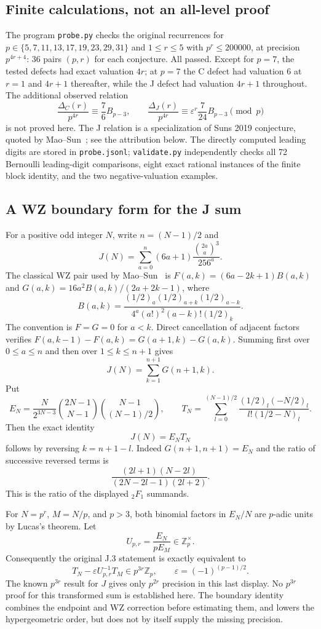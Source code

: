 \documentclass[11pt,letterpaper]{article}
\numberwithin{equation}{section}
\begin{document}
\subsection{Finite calculations, not an all-level proof}
The program \texttt{probe.py} checks the original recurrences for
$p\in\{5,7,11,13,17,19,23,29,31\}$ and $1\le r\le5$ with
$p^r\le200000$, at precision $p^{4r+4}$: 36 pairs $(p,r)$ for each
conjecture. All passed. Except for $p=7$, the tested defects had exact
valuation $4r$; at $p=7$ the C defect had valuation $6$ at $r=1$ and
$4r+1$ thereafter, while the J defect had valuation $4r+1$ throughout.
The additional observed relation
\[
 \frac{\Delta_C(r)}{p^{4r}}\equiv\frac76 B_{p-3},\qquad
 \frac{\Delta_J(r)}{p^{4r}}\equiv\varepsilon^r\frac7{24}B_{p-3}
 \pmod p
\]
is not proved here. The J relation is a specialization of Sun\textquotesingle s 2019 conjecture, quoted by Mao--Sun~\cite{II-MaoSun}; see the attribution below. The directly computed leading digits are stored
in \texttt{probe.jsonl}; \texttt{validate.py} independently checks all 72 Bernoulli leading-digit comparisons, eight exact rational instances of the finite block identity, and the two negative-valuation examples.

\subsection{A WZ boundary form for the J sum}
For a positive odd integer $N$, write $n=(N-1)/2$ and
\[
 J(N)=\sum_{a=0}^{n}(6a+1)\frac{\binom{2a}{a}^3}{256^a}.
\]
The classical WZ pair used by Mao--Sun~\cite[Section 3]{II-MaoSun} is
$F(a,k)=(6a-2k+1)B(a,k)$ and
$G(a,k)=16a^2B(a,k)/(2a+2k-1)$, where
\[
 B(a,k)=\frac{(1/2)_a(1/2)_{a+k}(1/2)_{a-k}}
 {4^a(a!)^2(a-k)!(1/2)_k}.
\]
The convention is $F=G=0$ for $a<k$. Direct cancellation of adjacent
factors verifies
$F(a,k-1)-F(a,k)=G(a+1,k)-G(a,k)$.
Summing first over $0\le a\le n$ and then over $1\le k\le n+1$ gives
\[
 J(N)=\sum_{k=1}^{n+1}G(n+1,k).
\]
Put
\[
 E_N=\frac{N}{2^{3N-3}}\binom{2N-1}{N-1}\binom{N-1}{(N-1)/2},
 \qquad
 T_N=\sum_{l=0}^{(N-1)/2}
 \frac{(1/2)_l(-N/2)_l}{l!(1/2-N)_l}.
\]
Then the exact identity
\[
 \boxed{J(N)=E_NT_N}
\]
follows by reversing $k=n+1-l$. Indeed $G(n+1,n+1)=E_N$ and the ratio
of successive reversed terms is
\[
 \frac{(2l+1)(N-2l)}{(2N-2l-1)(2l+2)}.
\]
This is the ratio of the displayed ${}_2F_1$ summands.

For $N=p^r$, $M=N/p$, and $p>3$, both binomial factors in $E_N/N$
are $p$-adic units by Lucas's theorem. Let
\[
 U_{p,r}=\frac{E_N}{pE_M}\in\mathbb Z_p^\times.
\]
Consequently the original J.3 statement is exactly equivalent to
\[
 T_N-\varepsilon U_{p,r}^{-1}T_M\in p^{3r}\mathbb Z_p,
 \qquad \varepsilon=(-1)^{(p-1)/2}.
\]
The known $p^{3r}$ result for $J$ gives only $p^{2r}$ precision in this
last display. No $p^{3r}$ proof for this transformed sum is established
here. The boundary identity combines the endpoint and WZ correction
before estimating them, and lowers the hypergeometric order, but does
not by itself supply the missing precision.
\end{document}
